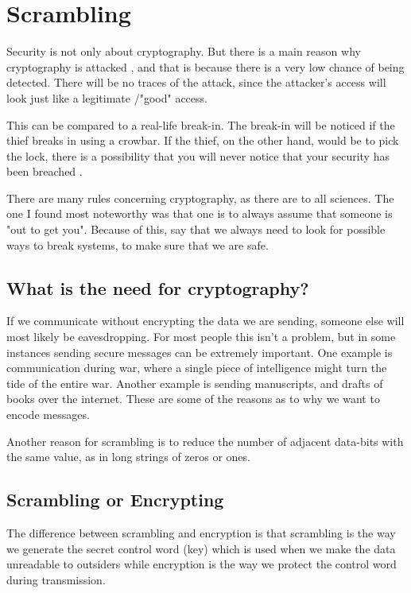 \chapter{Scrambling}\label{ch:Scrambling}
Security is not only about cryptography. But there is a main reason why 
cryptography is attacked , and that is because there is a very low chance 
of being detected. There will be no traces of the attack, since the attacker’s 
access will look just like a legitimate /"good" access. 

This can be compared to a real-life break-in. The break-in will be noticed if 
the thief breaks in using a crowbar. If the thief, on the other hand, would be 
to pick the lock, there is a possibility that you will never notice that your 
security has been breached \citep{Schneier:2003}.

There are many rules concerning cryptography, as there are to all sciences. 
The one I found most noteworthy was that one is to always assume that someone 
is "out to get you". Because of this, \citet[pp. 12--14]{Schneier:2003} say that 
we always need  to look for possible ways to break systems, to make sure that
we are safe.

\section{What is the need for cryptography?}
If we communicate without encrypting the data we are sending, someone 
else will most likely be eavesdropping. For most people this isn’t a problem, 
but in some instances sending secure messages can be extremely important. One 
example is communication during war, where a single piece of intelligence might 
turn the tide of the entire war. Another example is sending manuscripts, and 
drafts of books over the internet. These are some of the reasons as to why we 
want to encode messages.

Another reason for scrambling is to reduce the number of adjacent data-bits with 
the same value, as in long strings of zeros or ones. 


\section{Scrambling or Encrypting}
The difference between scrambling and encryption is that scrambling is the
way we generate the secret control word (key) which is used when we make the
data unreadable to outsiders while encryption is the way we protect the control 
word during transmission.

